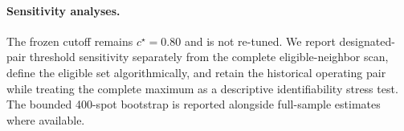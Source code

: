 \paragraph{Sensitivity analyses.} The frozen cutoff remains \(c^\star=0.80\) and is not re-tuned. We report designated-pair threshold sensitivity separately from the complete eligible-neighbor scan, define the eligible set algorithmically, and retain the historical operating pair while treating the complete maximum as a descriptive identifiability stress test. The bounded 400-spot bootstrap is reported alongside full-sample estimates where available.
